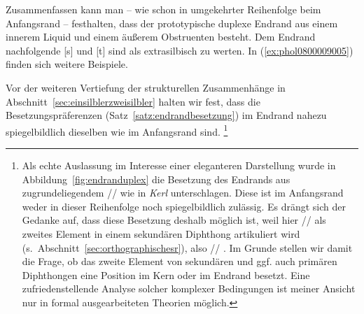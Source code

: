 Zusammenfassen kann man -- wie schon in umgekehrter Reihenfolge beim Anfangsrand -- festhalten, dass der prototypische duplexe Endrand aus einem innerem Liquid und einem äußerem Obstruenten besteht.
Dem Endrand nachfolgende [s] und [t] sind als extrasilbisch zu werten.
In (\ref{ex:phol0800009005}) finden sich weitere Beispiele.

\begin{exe}
  \ex \label{ex:phol0800009005}
  \begin{xlist}
  \end{xlist}
\end{exe}

Vor der weiteren Vertiefung der strukturellen Zusammenhänge in Abschnitt~\ref{sec:einsilblerzweisilbler} halten wir fest, dass die Besetzungspräferenzen (Satz~\ref{satz:endrandbesetzung}) im Endrand nahezu spiegelbildlich dieselben wie im Anfangsrand sind.%
\footnote{Als echte Auslassung im Interesse einer eleganteren Darstellung wurde in Abbildung~\ref{fig:endranduplex} die Besetzung des Endrands aus zugrundeliegendem // wie in \textit{Kerl} unterschlagen.
Diese ist im Anfangsrand weder in dieser Reihenfolge noch spiegelbildlich zulässig.
Es drängt sich der Gedanke auf, dass diese Besetzung deshalb möglich ist, weil hier // als zweites Element in einem sekundären Diphthong artikuliert wird (s.\ Abschnitt~\ref{sec:orthographischesr}), also // \phopro \textipa{[k\t{E@}l]}.
Im Grunde stellen wir damit die Frage, ob das zweite Element von sekundären und ggf. auch primären Diphthongen eine Position im Kern oder im Endrand besetzt. 
Eine zufriedenstellende Analyse solcher komplexer Bedingungen ist meiner Ansicht nur in formal ausgearbeiteten Theorien möglich.}


